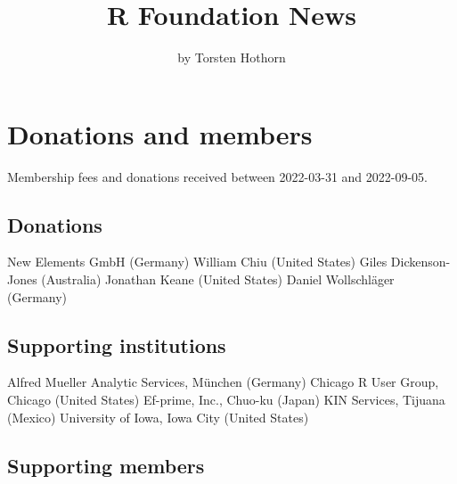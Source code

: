 
\title{R Foundation News}
\author{by Torsten Hothorn}

\maketitle

\section{Donations and members}

Membership fees and donations received between 
2022-03-31 and 2022-09-05.

\subsection{Donations}


New Elements GmbH (Germany)
William Chiu (United States)
Giles Dickenson-Jones (Australia)
Jonathan Keane (United States)
Daniel Wollschläger (Germany)

\subsection{Supporting institutions}


Alfred Mueller Analytic Services, München (Germany)
Chicago R User Group, Chicago (United States)
Ef-prime, Inc., Chuo-ku (Japan)
KIN Services, Tijuana (Mexico)
University of Iowa, Iowa City (United States)

\subsection{Supporting members}


